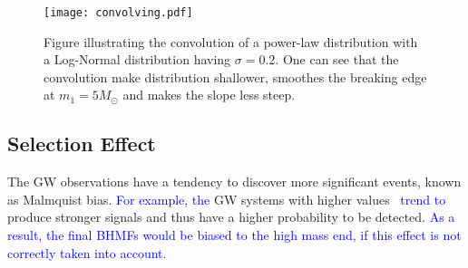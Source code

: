 \documentclass[twocolumn]{aastex62}
\newcommand{\blue}[1]{\textcolor{blue}{#1}}
\begin{document}
\begin{figure}%
\texttt{[image: convolving.pdf]}
\caption{
Figure illustrating the convolution of a power-law distribution with a Log-Normal distribution having $\sigma = 0.2$. One can see that the convolution make distribution shallower, smoothes the breaking edge at $m_1 = 5 M_{\odot}$ and makes the slope less steep.
}
\label{fig:result_slope}
\end{figure}

\subsection{Selection Effect}\label{sec_likelihood_sf}
The GW observations have a tendency to discover more significant events, known as Malmquist bias. \blue{For example, the} GW systems with higher values \mone\ \blue{trend to} produce stronger signals and thus have a higher probability to be detected. \blue{As a result, the final BHMFs would be biased to the high mass end, if this effect is not correctly taken into account}.
\end{document}
